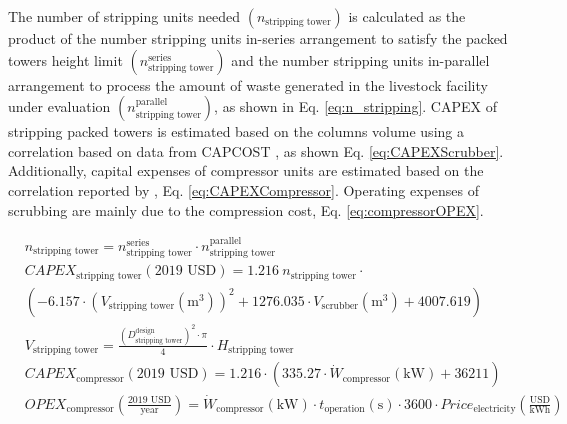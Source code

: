 \begin{refsection}[referencesCh6]

The number of stripping units needed $\left( n_{\text{stripping tower}} \right) $ is calculated as the product of the number stripping units in-series arrangement to satisfy the packed towers height limit $\left(n_{\text{stripping tower}}^{\text{series}} \right) $ and the number stripping units in-parallel arrangement to process the amount of waste generated in the livestock facility under evaluation $\left( n_{\text{stripping tower}}^{\text{parallel}} \right) $, as shown in Eq. \ref{eq:n_stripping}. CAPEX of stripping packed towers is estimated based on the columns volume using a correlation based on data from CAPCOST \citep{CAPCOST}, as shown Eq. \ref{eq:CAPEXScrubber}. Additionally, capital expenses of compressor units are estimated based on the correlation reported by \citet{almena2016technoeconomic}, Eq. \ref{eq:CAPEXCompressor}. Operating expenses of scrubbing are mainly due to the compression cost, Eq. \ref{eq:compressorOPEX}.

\begin{align}
	& n_{\text{stripping tower}} = n_{\text{stripping tower}}^{\text{series}} \cdot  n_{\text{stripping tower}}^{\text{parallel}} \label{eq:n_stripping} \\
	& CAPEX_{\text{stripping tower}} \left(\text{2019 USD}\right) = 1.216 \ n_{\text{stripping tower}} \cdot  \nonumber
	\\
	& \left(-6.157 \cdot \left(V_{\text{stripping tower}} \left(\text{m}^3\right)\right)^2 + 1276.035 \cdot V_{\text{scrubber}} \left(\text{m}^3\right) + 4007.619\right) \label{eq:CAPEXScrubber}
	\\
	& V_{\text{stripping tower}} = \frac{\left(D_{\text{stripping tower}}^{\text{design}}\right)^2 \cdot \pi}{4} \cdot H_{\text{stripping tower}} 
	\\
	&
	CAPEX_{\text{compressor}} \left(\text{2019 USD}\right) = 1.216 \cdot \left(335.27 \cdot \dot{W}_{\text{compressor}} \left(\text{kW}\right) + 36211\right) \label{eq:CAPEXCompressor}
	\\
	& OPEX_{\text{compressor}} \left(\frac{\text{2019 USD}}{\text{year}}\right) = \dot{W}_{\text{compressor}} \left(\text{kW}\right) \cdot t_{\text{operation}} \left(\text{s}\right) \cdot 3600 \cdot Price_{\text{electricity}}\left(\frac{\text{USD}}{\text{kWh}}\right) \label{eq:compressorOPEX}
\end{align}	


\end{refsection}
